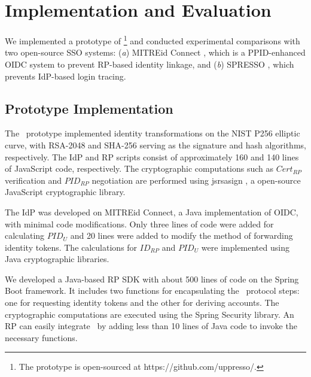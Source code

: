 \section{Implementation and Evaluation}
\label{sec:implementation}

We implemented a prototype of \usso\footnote{The prototype is open-sourced at https://github.com/uppresso/.} and conducted experimental comparisons with two open-source SSO systems: (\emph{a}) MITREid Connect \cite{MITREid}, which is a PPID-enhanced OIDC system to prevent RP-based identity linkage, and (\emph{b}) SPRESSO \cite{SPRESSO}, which prevents IdP-based login tracing.


\subsection{Prototype Implementation}
\label{subsec:proto-imple}

The \usso\ prototype implemented identity transformations on the NIST P256 elliptic curve, with RSA-2048 and SHA-256 serving as the signature and hash algorithms, respectively. The IdP and RP scripts consist of approximately 160 and 140 lines of JavaScript code, respectively.  %
The cryptographic computations such as $Cert_{RP}$ verification and $PID_{RP}$ negotiation are performed using jsrsasign \cite{jsrsasign}, a open-source JavaScript cryptographic library.

The IdP was developed on MITREid Connect\cite{MITREid}, a Java implementation of OIDC, %
with minimal code modifications. Only three lines of code were added for calculating $PID_U$ and 20 lines were added to modify the method of forwarding identity tokens.
The calculations for $ID_{RP}$ and $PID_U$ were implemented using Java cryptographic libraries.

We developed a Java-based RP SDK with about 500 lines of code on the Spring Boot framework. It includes two functions for encapsulating the \usso\ protocol steps: one for requesting identity tokens and the other for deriving accounts. The cryptographic computations are executed using the Spring Security library.
An RP can easily integrate \usso\ by  adding less than 10 lines of Java code to invoke the necessary functions.

